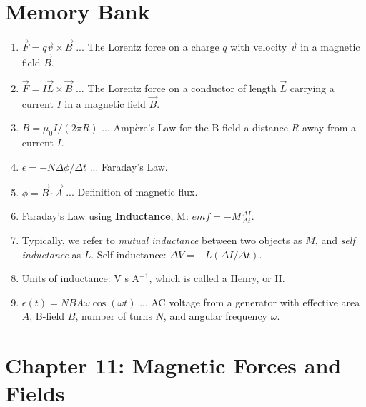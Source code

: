 \documentclass[10pt]{article}
\begin{document}
\maketitle

\section{Memory Bank}

\begin{enumerate}
\item $\vec{F} = q\vec{v} \times \vec{B}$ ... The Lorentz force on a charge $q$ with velocity $\vec{v}$ in a magnetic field $\vec{B}$.
\item $\vec{F} = I\vec{L} \times \vec{B}$ ... The Lorentz force on a conductor of length $\vec{L}$ carrying a current $I$ in a magnetic field $\vec{B}$.
\item $B = \mu_0 I/(2\pi R)$ ... Amp\`{e}re's Law for the B-field a distance $R$ away from a current $I$.
\item $\epsilon = -N \Delta \phi/\Delta t$ ... Faraday's Law.
\item $\phi = \vec{B} \cdot \vec{A}$ ... Definition of magnetic flux.
\item Faraday's Law using \textbf{Inductance}, M: $emf = -M \frac{\Delta I}{\Delta t}$.
\item Typically, we refer to \textit{mutual inductance} between two objects as $M$, and \textit{self inductance} as $L$.  Self-inductance: $\Delta V = -L (\Delta I/\Delta t)$.
\item Units of inductance: V s A$^{-1}$, which is called a Henry, or H.
\item $\epsilon(t) = N B A \omega \cos(\omega t)$ ...  AC voltage from a generator with effective area $A$, B-field $B$, number of turns $N$, and angular frequency $\omega$.
\end{enumerate}

\clearpage

\section{Chapter 11: Magnetic Forces and Fields}
\end{document}
